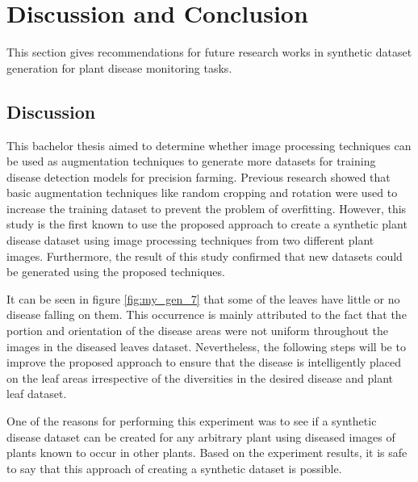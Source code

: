 
\chapter{Discussion and Conclusion} %

\label{Chapter5} %
This section gives recommendations for future research works in synthetic dataset generation for plant disease monitoring tasks.
\section{Discussion}
This bachelor thesis aimed to determine whether image processing techniques can be used as augmentation techniques to generate more datasets for training disease detection models for precision farming. Previous research showed that basic augmentation techniques like random cropping and rotation were used to increase the training dataset to prevent the problem of overfitting. However, this study is the first known to use the proposed approach to create a synthetic plant disease dataset using image processing techniques from two different plant images. Furthermore, the result of this study confirmed that new datasets could be generated using the proposed techniques.

It can be seen in figure \ref{fig:my_gen_7} that some of the leaves have little or no disease falling on them. This occurrence is mainly attributed to the fact that the portion and orientation of the disease areas were not uniform throughout the images in the diseased leaves dataset. Nevertheless, the following steps will be to improve the proposed approach to ensure that the disease is intelligently placed on the leaf areas irrespective of the diversities in the desired disease and plant leaf dataset.

One of the reasons for performing this experiment was to see if a synthetic disease dataset can be created for any arbitrary plant using diseased images of plants known to occur in other plants. Based on the experiment results, it is safe to say that this approach of creating a synthetic dataset is possible.


